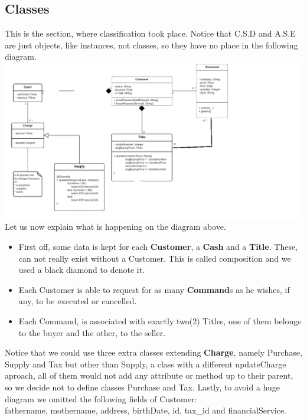 \documentclass{article}
\begin{document}
\subsection{Classes}
This is the section, where classification took place. Notice that C.S.D and A.S.E are just objects, like instances, not classes, so they have no place in the following diagram.\\
\includegraphics[scale=0.3]{classesII}\\
Let us now explain what is happening on the diagram above.\\
\begin{itemize}
\item First off, some data is kept for each \textbf{Customer}, a \textbf{Cash} and a \textbf{Title}. 
These, can not really exist without a Customer. 
This is called composition and we used a black diamond to denote it.
\item Each Customer is able to request for as many \textbf{Command}s as he wishes, if any, to be executed or cancelled.
\item Each Command, is associated with exactly two(2) Titles, one of them belongs to the buyer and the other, to the seller. 
\end{itemize}
Notice that we could use three extra classes extending \textbf{Charge}, namely Purchase, Supply and Tax but other than Supply, a class with a different updateCharge aproach, all of them would not add any attribute or method up to their parent, so we decide not to define classes Purchase and Tax. Lastly, to avoid a huge diagram we omitted the following fields of Customer:\\  
fathername, mothername, address, birthDate, id, tax{\_}id and financialService.
   
\newpage
\end{document}
